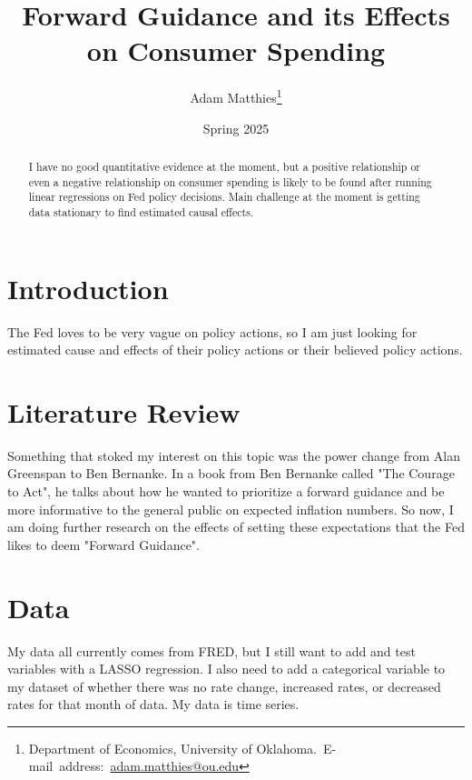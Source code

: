 \documentclass[12pt,english]{article}
\begin{document}
\begin{singlespace}
\title{Forward Guidance and its Effects on Consumer Spending}
\end{singlespace}

\author{Adam Matthies\thanks{Department of Economics, University of Oklahoma.\
E-mail~address:~\href{mailto:student.name@ou.edu}{adam.matthies@ou.edu}}}

\date{Spring 2025}

\maketitle

\begin{abstract}
\begin{singlespace}
I have no good quantitative evidence at the moment, but a positive relationship or even a negative
relationship on consumer spending is likely to be found after running linear regressions on Fed
policy decisions. Main challenge at the moment is getting data stationary to find estimated
causal effects.
\end{singlespace}

\end{abstract}
\vfill{}


\pagebreak{}


\section{Introduction}\label{sec:intro}
The Fed loves to be very vague on policy actions, so I am just looking for estimated cause and
effects of their policy actions or their believed policy actions. 

\section{Literature Review}\label{sec:litreview}
Something that stoked my interest on this topic was the power change from Alan Greenspan to 
Ben Bernanke. In a book from Ben Bernanke called "The Courage to Act", he talks about how he wanted
to prioritize a forward guidance and be more informative to the general public on expected inflation
numbers. So now, I am doing further research on the effects of setting these expectations that the
Fed likes to deem "Forward Guidance".



\section{Data}\label{sec:data}
My data all currently comes from FRED, but I still want to add and test variables with a LASSO
regression. I also need to add a categorical variable to my dataset of whether there was no
rate change, increased rates, or decreased rates for that month of data. My data is time series.
\end{document}
